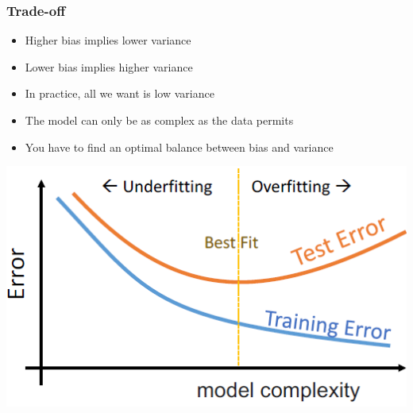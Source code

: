 \subsubsection{Trade-off}
\begin{itemize}
    \item Higher bias implies lower variance
    \item Lower bias implies higher variance
    \item In practice, all we want is low variance
    \item The model can only be as complex as the data permits
    \item You have to find an optimal balance between bias and variance
\end{itemize}
\includegraphics[width=0.6\linewidth]{./img/tradeoff.png}

